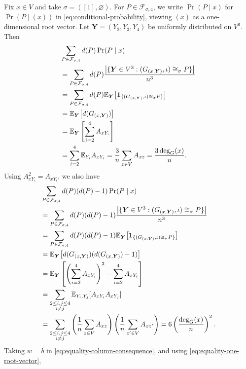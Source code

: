 Fix $x\in V$ and take $\sigma=([1],\varnothing)$.
For $P\in\mathcal F_{\sigma,4}$, we write $\Pr(P\mid x)$ for
$\Pr(P\mid(x))$ in \eqref{eq:conditional-probability}, viewing $(x)$
as a one-dimensional root vector.
Let $\boldsymbol Y=(Y_2,Y_3,Y_4)$ be uniformly distributed on $V^3$.
Then
\begingroup
\allowdisplaybreaks[1]
\begin{align}
&\sum_{P\in\mathcal F_{\sigma,4}}d(P)\Pr(P\mid x)\notag\\
&=\sum_{P\in\mathcal F_{\sigma,4}}d(P)
\frac{\big|\{\boldsymbol Y\in V^3:
(G_{(x,\boldsymbol Y)},\iota)\cong_\sigma P\}\big|}{n^3}\notag\\
&=\sum_{P\in\mathcal F_{\sigma,4}}d(P)
\mathbb E_{\boldsymbol Y}\big[\mathbf 1_{\{(G_{(x,\boldsymbol Y)},\iota)\cong_\sigma P\}}\big]\notag\\
&=\mathbb E_{\boldsymbol Y}\big[d(G_{(x,\boldsymbol Y)})\big]\notag\\
&=\mathbb E_{\boldsymbol Y}\left[\sum_{i=2}^4 A_{xY_i}\right]\notag\\
&=\sum_{i=2}^4\mathbb E_{Y_i}A_{xY_i}
=\frac3n\sum_{z\in V}A_{xz}
=\frac{3\deg_G(x)}n.
\label{eq:equality-degree-first-moment}
\end{align}
Using $A_{xY_i}^2=A_{xY_i}$, we also have
\begin{align}
&\sum_{P\in\mathcal F_{\sigma,4}}d(P)(d(P)-1)\Pr(P\mid x)\notag\\
&=\sum_{P\in\mathcal F_{\sigma,4}}d(P)(d(P)-1)
\frac{\big|\{\boldsymbol Y\in V^3:
(G_{(x,\boldsymbol Y)},\iota)\cong_\sigma P\}\big|}{n^3}\notag\\
&=\sum_{P\in\mathcal F_{\sigma,4}}d(P)(d(P)-1)
\mathbb E_{\boldsymbol Y}\big[\mathbf 1_{\{(G_{(x,\boldsymbol Y)},\iota)\cong_\sigma P\}}\big]\notag\\
&=\mathbb E_{\boldsymbol Y}\big[
 d(G_{(x,\boldsymbol Y)})(d(G_{(x,\boldsymbol Y)})-1)\big]\notag\\
&=\mathbb E_{\boldsymbol Y}\left[
\left(\sum_{i=2}^4 A_{xY_i}\right)^2-\sum_{i=2}^4 A_{xY_i}\right]\notag\\
&=\sum_{\substack{2\leq i,j\leq4\\i\ne j}}
\mathbb E_{Y_i,Y_j}[A_{xY_i}A_{xY_j}]\notag\\
&=\sum_{\substack{2\leq i,j\leq4\\i\ne j}}
\left(\frac1n\sum_{z\in V}A_{xz}\right)
\left(\frac1n\sum_{z'\in V}A_{xz'}\right)
=6\left(\frac{\deg_G(x)}n\right)^2.
\label{eq:equality-degree-second-moment}
\end{align}
Taking $w=b$ in \eqref{eq:equality-column-consequence}, and using
\eqref{eq:equality-one-root-vector},
